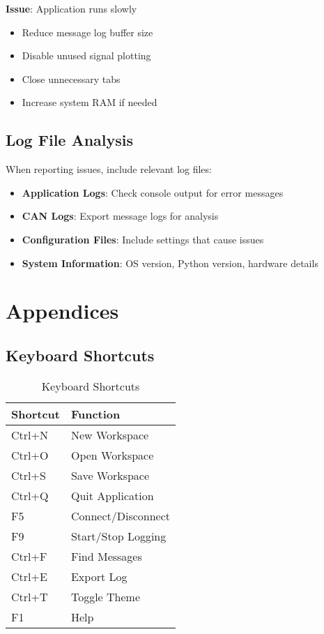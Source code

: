 \documentclass[11pt,a4paper]{article}
\begin{document}
\textbf{Issue}: Application runs slowly
\begin{itemize}
    \item Reduce message log buffer size
    \item Disable unused signal plotting
    \item Close unnecessary tabs
    \item Increase system RAM if needed
\end{itemize}

\subsection{Log File Analysis}

When reporting issues, include relevant log files:

\begin{itemize}
    \item \textbf{Application Logs}: Check console output for error messages
    \item \textbf{CAN Logs}: Export message logs for analysis
    \item \textbf{Configuration Files}: Include settings that cause issues
    \item \textbf{System Information}: OS version, Python version, hardware details
\end{itemize}

\section{Appendices}

\subsection{Keyboard Shortcuts}

\begin{table}[h]
\centering
\begin{tabular}{@{}ll@{}}
\toprule
\textbf{Shortcut} & \textbf{Function} \\
\midrule
Ctrl+N & New Workspace \\
Ctrl+O & Open Workspace \\
Ctrl+S & Save Workspace \\
Ctrl+Q & Quit Application \\
F5 & Connect/Disconnect \\
F9 & Start/Stop Logging \\
Ctrl+F & Find Messages \\
Ctrl+E & Export Log \\
Ctrl+T & Toggle Theme \\
F1 & Help \\
\bottomrule
\end{tabular}
\caption{Keyboard Shortcuts}
\end{table}
\end{document}
